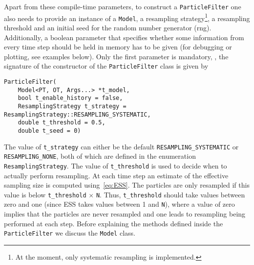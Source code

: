 Apart from these compile-time parameters, to construct a
\texttt{ParticleFilter} one also needs to provide an instance of a
\texttt{Model}, a resampling strategy\footnote{At the moment, only
  systematic resampling is implemented.}, a resampling threshold and
an initial seed for the random number generator (rng). Additionally, a
boolean parameter that specifies whether some information from every
time step should be held in memory has to be given (\eg for debugging
or plotting, see examples below). Only the first parameter is
mandatory, \ie, the signature of the constructor of the
\texttt{ParticleFilter} class is given by
\begin{verbatim}
ParticleFilter(
    Model<PT, OT, Args...> *t_model,
    bool t_enable_history = false,
    ResamplingStrategy t_strategy = ResamplingStrategy::RESAMPLING_SYSTEMATIC,
    double t_threshold = 0.5, 
    double t_seed = 0)
\end{verbatim}
The value of \texttt{t\_strategy} can either be the default
\texttt{RESAMPLING\_SYSTEMATIC} or \texttt{RESAMPLING\_NONE}, both of
which are defined in the enumeration \texttt{ResamplingStrategy}. The
value of \texttt{t\_threshold} is used to decide when to actually
perform resampling. At each time step an estimate of the effective
sampling size is computed using~\eqref{eq:ESS}. The particles are only
resampled if this value is below \texttt{t\_threshold} $\times$
\texttt{N}. Thus, \texttt{t\_threshold} should take values between
zero and one (since ESS takes values between 1 and \texttt{N}), where
a value of zero implies that the particles are never resampled and one
leads to resampling being performed at each step. Before explaining
the methods defined inside the \texttt{ParticleFilter} we discuss the
\texttt{Model} class.

